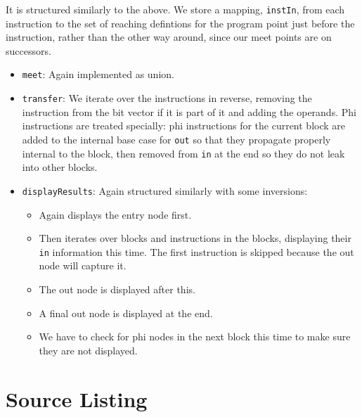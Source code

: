 \documentclass[12pt]{article}
\begin{document}
It is structured similarly to the above. We store a mapping, \verb|instIn|, from each instruction to the set of reaching defintions for the program point just before the instruction, rather than the other way around, since our meet points are on successors.

\begin{itemize}
\item \verb|meet|: Again implemented as union.
\item \verb|transfer|: We iterate over the instructions in reverse, removing the instruction from the bit vector if it is part of it and adding the operands. Phi instructions are treated specially: phi instructions for the current block are added to the internal base case for \verb|out| so that they propagate properly internal to the block, then removed from \verb|in| at the end so they do not leak into other blocks.
\item \verb|displayResults|: Again structured similarly with some inversions:
	\begin{itemize}
	\item Again displays the entry node first.
	\item Then iterates over blocks and instructions in the blocks, displaying their \verb|in| information this time. The first instruction is skipped because the out node will capture it.
	\item The out node is displayed after this.
	\item A final out node is displayed at the end.
	\item We have to check for phi nodes in the next block this time to make sure they are not displayed.
	\end{itemize}
\end{itemize} 

\section{Source Listing}
\end{document}
